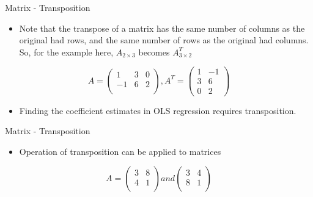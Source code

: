 \documentclass[
  ignorenonframetext,
]{beamer}
\providecommand{\tightlist}{%
  \setlength{\itemsep}{0pt}\setlength{\parskip}{0pt}}
\begin{document}
\begin{frame}{Matrix - Transposition}
\protect\hypertarget{matrix---transposition-1}{}

\begin{itemize}
\tightlist
\item
  Note that the transpose of a matrix has the same number of columns as
  the original had rows, and the same number of rows as the original had
  columns. So, for the example here, \(A_{2×3}\) becomes \(A^{T}_{3×2}\)
\end{itemize}

\[ A= \begin{pmatrix}
  1 & 3 & 0 \\
  -1 & 6 & 2  \\
 \end{pmatrix}
 , 
A^{T}= \begin{pmatrix}
 1 & -1  \\
  3 & 6   \\
  0 & 2
 \end{pmatrix}\]

\begin{itemize}
\tightlist
\item
  Finding the coefficient estimates in OLS regression requires
  transposition.
\end{itemize}

\end{frame}

\begin{frame}{Matrix - Transposition}
\protect\hypertarget{matrix---transposition-2}{}

\begin{itemize}
\tightlist
\item
  Operation of transposition can be applied to matrices
\end{itemize}

\[ A= \begin{pmatrix}
  3 & 8  \\
  4 & 1  \\
 \end{pmatrix}
 and
 \begin{pmatrix}
  3 & 4  \\
  8 & 1  \\
 \end{pmatrix}\]

\end{frame}
\end{document}
